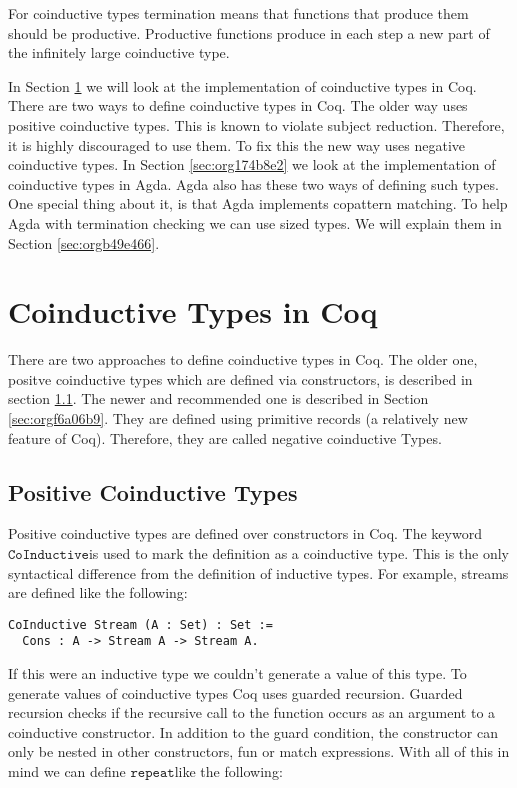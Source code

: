 \documentclass[a4paper,cleardoubleempty,BCOR1cm]{scrbook}
\begin{document}
For coinductive types termination means that functions that produce them
should be productive. Productive functions produce in each step a
new part of the infinitely large coinductive type.

In Section \ref{sec:orgb36caa9} we will look at the implementation of
coinductive types in Coq. There are two ways to define coinductive types in
Coq. The older way uses positive coinductive types. This is known to violate
subject reduction. Therefore, it is highly discouraged to use them. To fix
this the new way uses negative coinductive types. In Section \ref{sec:org174b8e2}
we look at the implementation of coinductive types in Agda. Agda also has these two ways of
defining such types. One special thing about it, is that Agda implements
copattern matching. To help Agda with termination checking we can use sized
types. We will explain them in Section \ref{sec:orgb49e466}.
\section{Coinductive Types in Coq}
\label{sec:orgb36caa9}
There are two approaches to define coinductive types in Coq. The older one,
positve coinductive types which are defined via constructors, is
described in section \ref{sec:orgd7a50c1}. The newer and recommended one is
described in Section \ref{sec:orgf6a06b9}. They are defined using
primitive records (a relatively new feature of Coq). Therefore, they are
called negative coinductive Types.

\subsection{Positive Coinductive Types}
\label{sec:orgd7a50c1}
Positive coinductive types are defined over constructors in Coq.  The keyword
\linebreak $\mathtt{CoInductive}$\;is used to mark the definition as a coinductive type.
This is the only syntactical difference from the definition of inductive
types. For example, streams are defined like the following:

\begin{verbatim}
CoInductive Stream (A : Set) : Set :=
  Cons : A -> Stream A -> Stream A.
\end{verbatim}

If this were an inductive type we couldn't generate a value of this type. To
generate values of coinductive types Coq uses guarded recursion. Guarded
recursion checks if the recursive call to the function occurs as an argument
to a coinductive constructor. In addition to the guard condition, the
constructor can only be nested in other constructors, fun or match
expressions. With all of this in mind we can define $\mathtt{repeat}$\;like the
following:
\end{document}
